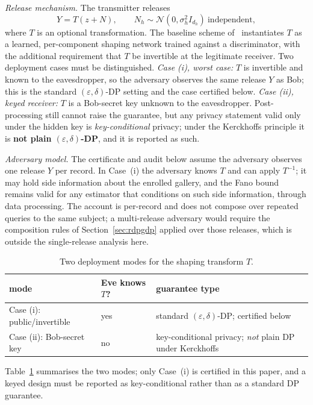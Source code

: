 \documentclass{ieeetj}
\theoremstyle{plain}
\theoremstyle{definition}
\begin{document}
\emph{Release mechanism.} The transmitter releases
\begin{equation}
Y=T\!\left(z+N\right),\qquad
N_h\sim\mathcal{N}\!\left(0,\sigma_h^{2} I_{d_h}\right)\ \text{independent},
\label{eq:mechanism}
\end{equation}
where $T$ is an optional transformation. The baseline scheme
of~\cite{arXiv2510} instantiates $T$ as a learned, per-component shaping
network trained against a discriminator, with the additional requirement that
$T$ be invertible at the legitimate receiver. Two deployment cases must be
distinguished. \emph{Case (i), worst case:} $T$ is invertible and known to the
eavesdropper, so the adversary observes the same release $Y$ as Bob; this is the
standard $(\varepsilon,\delta)$-DP setting and the case certified below.
\emph{Case (ii), keyed receiver:} $T$ is a Bob-secret key unknown to the
eavesdropper. Post-processing still cannot raise the guarantee, but any
privacy statement valid only under the hidden key is \emph{key-conditional}
privacy; under the Kerckhoffs principle it is \textbf{not plain
$(\varepsilon,\delta)$-DP}, and it is reported as such.

\emph{Adversary model.} The certificate and audit below assume the adversary
observes one release $Y$ per record. In Case~(i) the adversary knows $T$ and
can apply $T^{-1}$; it may hold side information about the enrolled gallery,
and the Fano bound remains valid for any estimator that conditions on such
side information, through data processing. The account is per-record and does
not compose over repeated queries to the same subject; a multi-release adversary
would require the composition rules of Section~\ref{sec:rdpgdp} applied over
those releases, which is outside the single-release analysis here.

\begin{table}[h]
\centering\footnotesize
\setlength{\tabcolsep}{3pt}
\caption{Two deployment modes for the shaping transform $T$.}
\label{tab:modes}
\begin{tabular}{p{2.2cm}p{2.1cm}p{2.4cm}}
\toprule
mode & Eve knows $T$? & guarantee type \\
\midrule
Case (i): public/invertible & yes & standard $(\varepsilon,\delta)$-DP;
certified below \\
Case (ii): Bob-secret key & no & key-conditional privacy; \emph{not} plain DP
under Kerckhoffs \\
\bottomrule
\end{tabular}
\end{table}
Table~\ref{tab:modes} summarises the two modes; only Case~(i) is certified in
this paper, and a keyed design must be reported as key-conditional rather than
as a standard DP guarantee.
\end{document}
